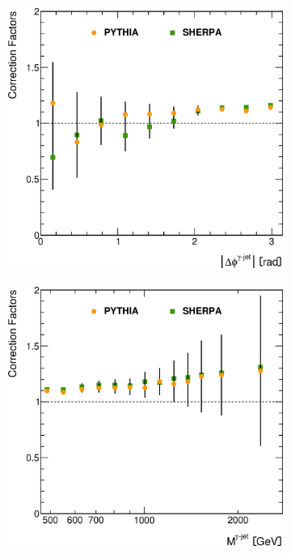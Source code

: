 \documentclass[12pt, twoside]{article}
\numberwithin{equation}{section}
\numberwithin{figure}{section}
\newenvironment{changemargin}[2]{%
\begin{list}{}{%
\setlength{\topsep}{0pt}%
\setlength{\leftmargin}{#1}%
\setlength{\rightmargin}{#2}%
\setlength{\listparindent}{\parindent}%
\setlength{\itemindent}{\parindent}%
\setlength{\parsep}{\parskip}%
}%
\item[]}{\end{list}}
\begin{document}
\begin{figure}
\begin{changemargin}{-1.0cm}{-0.75cm}
\begin{changemargin}{-0.75cm}{-1.0cm}
        \vspace{0.2cm}
        \begin{subfigure}[b]{0.37\textwidth}
            \includegraphics[width=\textwidth]{./images/CorrectionFactors/CORR_FACT-107.eps}
            \subcaption{}
            \label{fig:CorrectionFactorPhiPhotonJet}
        \end{subfigure}
        \begin{subfigure}[b]{0.37\textwidth}
            \includegraphics[width=\textwidth]{./images/CorrectionFactors/CORR_FACT-108.eps}

\end{subfigure}
\end{changemargin}
\end{changemargin}
\end{figure}
\end{document}
